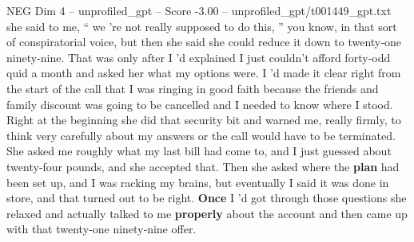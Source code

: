 \begin{textsample}{NEG Dim 4 – unprofiled\_gpt – Score -3.00 – unprofiled\_gpt/t001449\_gpt.txt}  \label{ex:f4_neg_021}
she said to me, “ we ’re not really supposed to do this, ” you know, in that sort of conspiratorial voice, but then she said she could reduce it down to twenty‑one ninety‑nine.
That was only after I ’d explained I just couldn't afford forty‑odd quid a month and asked her what my options were.
I ’d made it clear right from the start of the call that I was ringing in good faith because the friends and family discount was going to be cancelled and I needed to know where I stood.
Right at the beginning she did that security bit and warned me, really firmly, to think very carefully about my answers or the call would have to be terminated.
She asked me roughly what my last bill had come to, and I just guessed about twenty‑four pounds, and she accepted that.
Then she asked where the \textbf{plan} had been set up, and I was racking my brains, but eventually I said it was done in store, and that turned out to be right. \textbf{Once} I ’d got through those questions she relaxed and actually talked to me \textbf{properly} about the account and then came up with that twenty‑one ninety‑nine offer.

\end{textsample}
